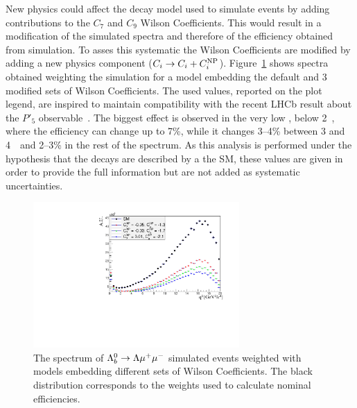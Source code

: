 New physics could affect the decay model used to simulate events by adding contributions to the $C_7$ and $C_9$ 
Wilson Coefficients. This would result in a modification of the simulated \qsq spectra and therefore of the efficiency obtained from simulation.
To asses this systematic the Wilson Coefficients are modified by adding a new physics component
($C_i \rightarrow C_i + C_i^{ \rm NP}$). Figure~\ref{fig:wilson_q2} shows \qsq spectra
obtained weighting the simulation for a model embedding the default and 3 modified sets
of Wilson Coefficients. The used values, reported on the plot legend, are inspired
to maintain compatibility with the recent LHCb result about the $P'_5$ observable~\cite{Descotes-Genon:2013wba}.
The biggest effect is observed in the very low \qsq, below 2~\gevgevcccc, where the efficiency can change
up to 7\%, while it changes 3--4\% between 3 and 4~\gevgevcccc~and 2--3\% in the rest of the spectrum.
As this analysis is performed under the hypothesis that the decays are described by a the SM,
these values are given in order to provide the full information but are not added 
as systematic uncertainties. 

\begin{figure}
\centering
\includegraphics[width=0.7\textwidth]{Lmumu/figs/wilson_q2.pdf}
\caption{The \qsq spectrum of $\Lambda^0_b\rightarrow\Lambda\mu^+\mu^-$ simulated events weighted with models embedding different sets of Wilson Coefficients.
The black distribution corresponds to the weights used to calculate nominal efficiencies.}
\label{fig:wilson_q2}
\end{figure}


